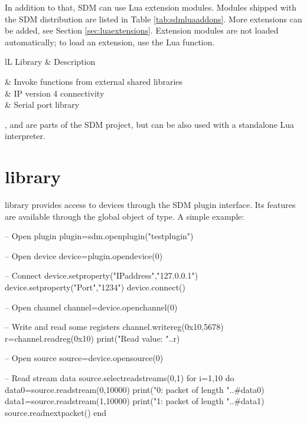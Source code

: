 \documentclass[a4paper,12pt,twoside,extrafontsizes]{memoir}
\begin{document}
In addition to that, SDM can use Lua extension modules. Modules shipped with the SDM distribution are listed in Table \ref{tab:sdmluaaddons}. More extensions can be added, see Section \ref{sec:luaextensions}. Extension modules are not loaded automatically; to load an extension, use the  Lua function.

\begin{table}[htbp]
	\caption{Addon libraries shipped with SDM}
	\label{tab:sdmluaaddons}
	\begin{tabularx}{\textwidth}{lL}
		\toprule
		Library & Description \\
		\midrule
		
		 & Invoke functions from external shared libraries \\
		 & IP version 4 connectivity \\
		 & Serial port library \\
		
		\bottomrule
	\end{tabularx}
\end{table}

,  and  are parts of the SDM project, but can be also used with a standalone Lua interpreter.

\section[sdm library]{ library}

 library provides access to devices through the SDM plugin interface. Its features are available through the  global object of  type. A simple example:

\begin{breakshellcmds}\begin{luacode}
-- Open plugin
plugin=sdm.openplugin("testplugin")

-- Open device
device=plugin.opendevice(0)

-- Connect
device.setproperty("IPaddress","127.0.0.1")
device.setproperty("Port","1234")
device.connect()

-- Open channel
channel=device.openchannel(0)

-- Write and read some registers
channel.writereg(0x10,5678)
r=channel.readreg(0x10)
print("Read value: "..r)

-- Open source
source=device.opensource(0)

-- Read stream data
source.selectreadstreams({0,1})
for i=1,10 do
    data0=source.readstream(0,10000)
    print("0: packet of length "..#data0)
    data1=source.readstream(1,10000)
    print("1: packet of length "..#data1)
    source.readnextpacket()
end
\end{luacode}\end{breakshellcmds}
\end{document}
